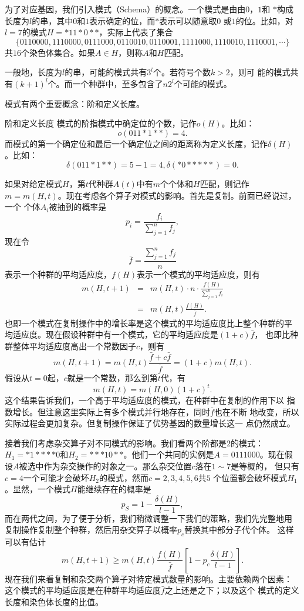 为了对应基因，我们引入模式（Schema）的概念。一个模式是由由$0$，$1$和
$*$构成长度为$l$的串，其中$0$和$1$表示确定的位，而$*$表示可以随意取$0$
或$1$的位。比如，对$l = 7$的模式$H = *11*0**$，实际上代表了集合
$$
\{0110000, 1110000, 0111000, 0110010, 0110001, 1111000, 1110010, 1110001, \cdots\}
$$
共$16$个染色体集合。如果$A \in H$，则称$A$和$H$匹配。

一般地，长度为$l$的串，可能的模式共有$3^l$个。若符号个数$k > 2$，则可
能的模式共有$(k + 1)^l$个。而一个种群中，至多包含了$n2^l$个可能的模式。

模式有两个重要概念：阶和定义长度。

\begin{definition}{\hei 阶和定义长度}
模式的阶指模式中确定位的个数，记作$o(H)$。比如：
$$
o(011*1**) = 4.
$$
而模式的第一个确定位和最后一个确定位之间的距离称为定义长度，记作$\delta(H)$。比如：
$$
\delta(011*1**) = 5 - 1 = 4, \delta(*0*****) = 0.
$$
\end{definition}

如果对给定模式$H$，第$t$代种群$A(t)$中有$m$个个体和$H$匹配，则记作$m =
m(H, t)$。现在考虑各个算子对模式的影响。首先是复制。前面已经说过，一个
个体$A_i$被抽到的概率是
$$
p_i = \frac{f_i}{\sum_{j = 1}^n f_j},
$$
现在令
$$
\bar{f} = \frac{\sum_{j = 1}^n f_j}{n}
$$
表示一个种群的平均适应度，$f(H)$表示一个模式的平均适应度，则有
\begin{eqnarray*}
  m(H, t + 1) & = & m(H, t) \cdot n \cdot \frac{f(H)}{\sum_{j = 1}^n f_i} \\
  & = & m(H, t) \frac{f(H)}{\bar{f}}.
\end{eqnarray*}
也即一个模式在复制操作中的增长率是这个模式的平均适应度比上整个种群的平
均适应度。现在假设种群中有一个模式，它的平均适应度是$(1 + c)\bar{f}$，
也即比种群整体平均适应度高出一个常数因子$c$，则有
$$
m(H, t + 1) = m(H, t) \frac{\bar{f} + c\bar{f}}{\bar{f}} = (1 + c)m(H, t).
$$
假设从$t = 0$起，$c$就是一个常数，那么到第$t$代，有
$$
m(H, t) = m(H, 0)(1 + c)^t.
$$
这个结果告诉我们，一个高于平均适应度的模式，在种群中在复制的作用下以
指数增长。但注意这里实际上有多个模式并行地存在，同时$\bar{f}$也在不断
地改变，所以实际过程会更加复杂。但复制操作保证了优势基因的数量增长这一
点仍然成立。

接着我们考虑杂交算子对不同模式的影响。我们看两个阶都是$2$的模式：$H_1
= *1****0$和$H_2 = ***10**$。他们一个共同的实例是$A = 0111000$。现在假
设$A$被选中作为杂交操作的对象之一。那么杂交位置$c$落在$1 \sim 7$是等概的，
但只有$c = 4$一个可能才会破坏$H_2$的模式，然而$c = 2, 3, 4, 5, 6$共$5$
个位置都会破坏模式$H_1$。显然，一个模式$H$能继续存在的概率是
\begin{equation}
  p_S = 1 - \frac{\delta(H)}{l - 1},
  \label{eq::GA_ps}
\end{equation}
而在两代之间，为了便于分析，我们稍微调整一下我们的策略，我们先完整地用
复制操作复制整个种群，然后用杂交算子以概率$p_c$替换其中部分子代个体。
这样可以有估计
\begin{equation}
  m(H, t + 1) \geq m(H, t) \frac{f(H)}{\bar{f}}\left[1 - p_c
    \frac{\delta(H)}{l - 1}\right].
\end{equation}
现在我们来看复制和杂交两个算子对特定模式数量的影响。主要依赖两个因素：
这个模式的平均适应度是在种群平均适应度$\bar{f}$之上还是之下；以及这个
模式的定义长度和染色体长度的比值。


